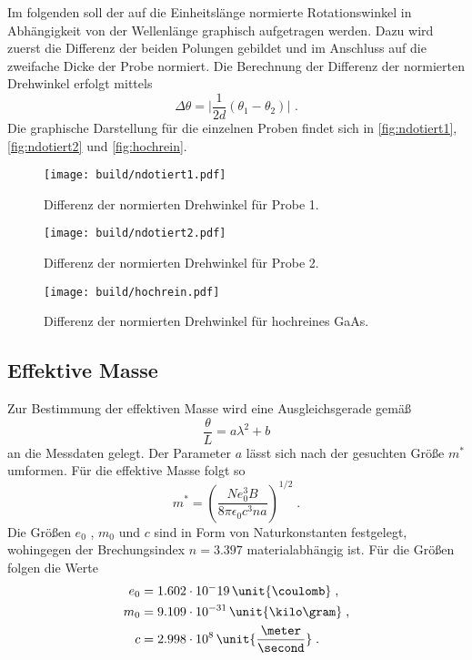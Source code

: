 Im folgenden soll der auf die Einheitslänge normierte Rotationswinkel in Abhängigkeit von der Wellenlänge graphisch aufgetragen werden. Dazu 
wird zuerst die Differenz der beiden Polungen gebildet und im Anschluss auf die zweifache Dicke der Probe normiert. 
Die Berechnung der Differenz der normierten Drehwinkel erfolgt mittels
\begin{equation*}
    \Delta \theta = \lvert \frac{1}{2d}(\theta_1 - \theta_2) \rvert \,\, .
\end{equation*}
Die graphische Darstellung für die einzelnen Proben findet sich in \autoref{fig:ndotiert1}, \autoref{fig:ndotiert2} und \autoref{fig:hochrein}.
\begin{figure}[H]
    \centering
    \texttt{[image: build/ndotiert1.pdf]}
    \caption{Differenz der normierten Drehwinkel für Probe 1.}
    \label{fig:ndotiert1}
\end{figure}

\begin{figure}[H]
    \centering
    \texttt{[image: build/ndotiert2.pdf]}
    \caption{Differenz der normierten Drehwinkel für Probe 2.}
    \label{fig:ndotiert2}
\end{figure}

\begin{figure}[H]
    \centering
    \texttt{[image: build/hochrein.pdf]}
    \caption{Differenz der normierten Drehwinkel für hochreines GaAs.}
    \label{fig:hochrein}
\end{figure}

\subsection{Effektive Masse}

Zur Bestimmung der effektiven Masse wird eine Ausgleichsgerade gemäß
\begin{equation*}
    \frac{\theta}{L}=a\lambda ^2 +b
\end{equation*} 
an die Messdaten gelegt.
Der Parameter $a$ lässt sich nach der gesuchten Größe $m^*$ umformen. Für die effektive Masse folgt so
\begin{equation*}
    m^*=\left(\frac{Ne_0^3 B}{8\pi \epsilon_0 c^3 na}\right)^{1/2}\; .
\end{equation*}
Die Größen $e_0$ , $m_0$ und $c$ sind in Form von Naturkonstanten festgelegt, wohingegen der Brechungsindex $n=3.397$\cite{GaAs} materialabhängig ist.
Für die Größen folgen die Werte 
\begin{align*}
    e_0&= 1.602 \cdot 10^-19 \, \unit{\coulomb}\; ,\\
    m_0&= 9.109 \cdot 10^{-31}\, \unit{\kilo \gram}\; ,\\
    c&= 2.998 \cdot 10^8\, \unit{\frac{\meter}{\second}}\; .
\end{align*}